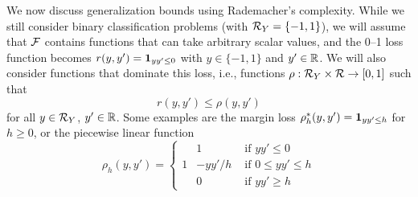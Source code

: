 We now discuss generalization bounds using Rademacher's complexity.
While we still consider binary classification problems (with ${\mathcal R}_Y = \{-1, 1\}$), we will assume  that ${\mathcal F}$ contains functions that can take arbitrary scalar values, and the 0--1 loss function becomes $r(y,y') = {\bm 1}_{yy' \leq 0}$ with $y\in \{-1,1\}$ and $y'\in {\mathbb{R}}$. We will also consider functions that dominate this loss, i.e., functions $\rho: {\mathcal R}_Y\times {\mathcal R} \to [0,1]$ such that
\[
r(y, y') \leq \rho(y, y')
\]
for all $y\in{\mathcal R}_Y$, $y'\in {\mathbb{R}}$. Some  examples are the margin loss $\rho^*_h(y,y') = {\bm 1}_{yy'\leq h}$ for $h \geq 0$, or the piecewise linear function
\[
\rho_h(y,y') = \left\{
\begin{aligned}
&1 &\text{ if } yy' \leq 0\\
1 &- yy'/h& \text{ if } 0\leq yy' \leq h \\
&0& \text{ if } yy'\geq h
\end{aligned}
\right.
\]

